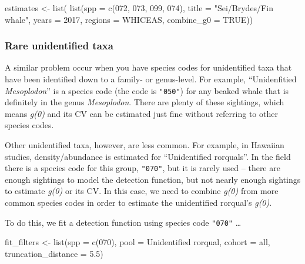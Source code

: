 \documentclass[
]{book}
\newenvironment{Shaded}{\begin{snugshade}}{\end{snugshade}}
\newcommand{\AttributeTok}[1]{\textcolor[rgb]{0.77,0.63,0.00}{#1}}
\newcommand{\ConstantTok}[1]{\textcolor[rgb]{0.00,0.00,0.00}{#1}}
\newcommand{\DecValTok}[1]{\textcolor[rgb]{0.00,0.00,0.81}{#1}}
\newcommand{\FloatTok}[1]{\textcolor[rgb]{0.00,0.00,0.81}{#1}}
\newcommand{\FunctionTok}[1]{\textcolor[rgb]{0.00,0.00,0.00}{#1}}
\newcommand{\NormalTok}[1]{#1}
\newcommand{\OtherTok}[1]{\textcolor[rgb]{0.56,0.35,0.01}{#1}}
\newcommand{\StringTok}[1]{\textcolor[rgb]{0.31,0.60,0.02}{#1}}
\begin{document}
\begin{Shaded}
\begin{Highlighting}[]
\NormalTok{estimates }\OtherTok{\textless{}{-}} \FunctionTok{list}\NormalTok{(}
  \FunctionTok{list}\NormalTok{(}\AttributeTok{spp =} \FunctionTok{c}\NormalTok{(}\StringTok{\textquotesingle{}072\textquotesingle{}}\NormalTok{, }\StringTok{\textquotesingle{}073\textquotesingle{}}\NormalTok{, }\StringTok{\textquotesingle{}099\textquotesingle{}}\NormalTok{, }\StringTok{\textquotesingle{}074\textquotesingle{}}\NormalTok{),}
       \AttributeTok{title =} \StringTok{"Sei/Bryde\textquotesingle{}s/Fin whale"}\NormalTok{,}
       \AttributeTok{years =} \DecValTok{2017}\NormalTok{,}
       \AttributeTok{regions =} \StringTok{\textquotesingle{}WHICEAS\textquotesingle{}}\NormalTok{,}
       \AttributeTok{combine\_g0 =} \ConstantTok{TRUE}\NormalTok{))}
\end{Highlighting}
\end{Shaded}

\hypertarget{rare-unidentified-taxa}{%
\subsubsection*{Rare unidentified taxa}\label{rare-unidentified-taxa}}

A similar problem occur when you have species codes for unidentified taxa that have been identified down to a family- or genus-level. For example, ``Unidenfitied \emph{Mesoplodon}'' is a species code (the code is \texttt{"050"}) for any beaked whale that is definitely in the genus \emph{Mesoplodon}. There are plenty of these sightings, which means \emph{g(0)} and its CV can be estimated just fine without referring to other species codes.

Other unidentified taxa, however, are less common. For example, in Hawaiian studies, density/abundance is estimated for ``Unidentified rorquals''. In the field there is a species code for this group, \texttt{"070"}, but it is rarely used -- there are enough sightings to model the detection function, but not nearly enough sightings to estimate \emph{g(0)} or its CV. In this case, we need to combine \emph{g(0)} from more common species codes in order to estimate the unidentified rorqual's \emph{g(0)}.

To do this, we fit a detection function using species code \texttt{"070"} \ldots{}

\begin{Shaded}
\begin{Highlighting}[]
\NormalTok{fit\_filters }\OtherTok{\textless{}{-}}
    \FunctionTok{list}\NormalTok{(}\AttributeTok{spp =} \FunctionTok{c}\NormalTok{(}\StringTok{\textquotesingle{}070\textquotesingle{}}\NormalTok{),}
         \AttributeTok{pool =} \StringTok{\textquotesingle{}Unidentified rorqual\textquotesingle{}}\NormalTok{,}
         \AttributeTok{cohort =} \StringTok{\textquotesingle{}all\textquotesingle{}}\NormalTok{,}
         \AttributeTok{truncation\_distance =} \FloatTok{5.5}\NormalTok{)}
\end{Highlighting}
\end{Shaded}
\end{document}
